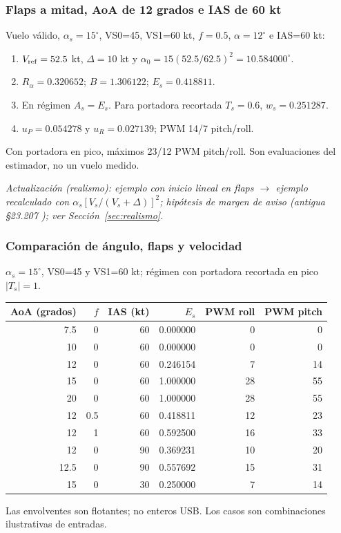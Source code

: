 \subsubsection{Flaps a mitad, AoA de 12 grados e IAS de 60 kt}
Vuelo válido, $\alpha_s=15^\circ$, VS0=45, VS1=60 kt, $f=0.5$, $\alpha=12^\circ$ e IAS=60 kt:
\begin{enumerate}
\item $V_{\rm ref}=52.5$ kt, $\Delta=10$ kt y $\alpha_0=15(52.5/62.5)^2=10.584000^\circ$.
\item $R_\alpha=0.320652$; $B=1.306122$; $E_s=0.418811$.
\item En régimen $A_s=E_s$. Para portadora recortada $T_s=0.6$, $w_s=0.251287$.
\item $u_P=0.054278$ y $u_R=0.027139$; PWM 14/7 pitch/roll.
\end{enumerate}
Con portadora en pico, máximos 23/12 PWM pitch/roll. Son evaluaciones del estimador, no un vuelo medido.

\textit{Actualización (realismo): ejemplo con inicio lineal en flaps $\rightarrow$ ejemplo recalculado con $\alpha_s[V_s/(V_s+\Delta)]^2$; hipótesis de margen de aviso (antigua §23.207 \cite{cfr23}); ver Sección~\ref{sec:realismo}.}

\subsubsection{Comparación de ángulo, flaps y velocidad}
$\alpha_s=15^\circ$, VS0=45 y VS1=60 kt; régimen con portadora recortada en pico $|T_s|=1$.
\begin{center}\begin{tabular}{rrrrrr}
\toprule AoA (grados)&$f$&IAS (kt)&$E_s$&PWM roll&PWM pitch\\\midrule
7.5&0&60&0.000000&0&0\\
10&0&60&0.000000&0&0\\
12&0&60&0.246154&7&14\\
15&0&60&1.000000&28&55\\
20&0&60&1.000000&28&55\\
12&0.5&60&0.418811&12&23\\
12&1&60&0.592500&16&33\\
12&0&90&0.369231&10&20\\
12.5&0&90&0.557692&15&31\\
15&0&30&0.250000&7&14\\
\bottomrule\end{tabular}\end{center}
Las envolventes son flotantes; no enteros USB. Los casos son combinaciones ilustrativas de entradas.

